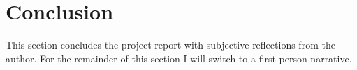 

%

\section{Conclusion}
\label{sec:conclusion}

This section concludes the project report with subjective reflections from the author. For the remainder of this section I will switch to a first person narrative.






